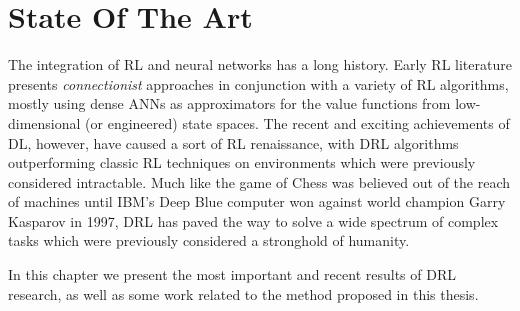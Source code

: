 \chapter{State Of The Art}
\label{chapter3_state_of_the_art}
\thispagestyle{empty}

\vspace{0.5cm}

The integration of RL and neural networks has a long history. Early 
RL literature \cite{rummery1994line, tesauro1995temporal, bertsekas1995neuro}
presents \textit{connectionist} approaches in conjunction with a variety
of RL algorithms, mostly using dense ANNs as approximators for the value 
functions from low-dimensional (or engineered) state spaces.
The recent and exciting achievements of DL, however, have caused a sort of RL 
renaissance, with DRL algorithms outperforming classic RL techniques on 
environments which were previously considered intractable. 
Much like the game of Chess was believed out of the reach of machines until 
IBM's Deep Blue computer \cite{campbell2002deep} won against world champion 
Garry Kasparov in 1997, DRL has paved the way to solve a wide spectrum of 
complex tasks which were previously considered a stronghold of humanity. 

In this chapter we present the most important and recent results of DRL research, 
as well as some work related to the method proposed in this thesis.

